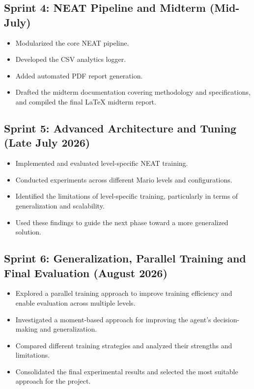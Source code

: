 \subsection{Sprint 4: NEAT Pipeline and Midterm (Mid-July)}

\begin{itemize}
    \item Modularized the core NEAT pipeline.
    \item Developed the CSV analytics logger.
    \item Added automated PDF report generation.
    \item Drafted the midterm documentation covering methodology and
    specifications, and compiled the final \LaTeX{} midterm report.
\end{itemize}

\subsection{Sprint 5: Advanced Architecture and Tuning (Late July 2026)}

\begin{itemize}
    \item Implemented and evaluated level-specific NEAT training.
    \item Conducted experiments across different Mario levels and
    configurations.
    \item Identified the limitations of level-specific training, particularly
    in terms of generalization and scalability.
    \item Used these findings to guide the next phase toward a more generalized
    solution.
\end{itemize}

\subsection{Sprint 6: Generalization, Parallel Training and Final Evaluation
(August 2026)}

\begin{itemize}
    \item Explored a parallel training approach to improve training efficiency
    and enable evaluation across multiple levels.
    \item Investigated a moment-based approach for improving the agent's
    decision-making and generalization.
    \item Compared different training strategies and analyzed their strengths
    and limitations.
    \item Consolidated the final experimental results and selected the most
    suitable approach for the project.
\end{itemize}

